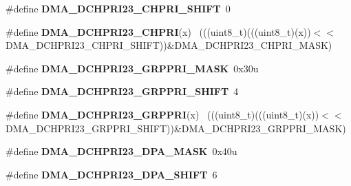 \begin{DoxyCompactItemize}
\item 
\hypertarget{group___d_m_a___register___masks_ga03381d386d0574388052124796754e0b}{}\#define {\bfseries D\+M\+A\+\_\+\+D\+C\+H\+P\+R\+I23\+\_\+\+C\+H\+P\+R\+I\+\_\+\+S\+H\+I\+F\+T}~0\label{group___d_m_a___register___masks_ga03381d386d0574388052124796754e0b}

\item 
\hypertarget{group___d_m_a___register___masks_gac7f5a2b9c90a49ef012027e61da81739}{}\#define {\bfseries D\+M\+A\+\_\+\+D\+C\+H\+P\+R\+I23\+\_\+\+C\+H\+P\+R\+I}(x)                                    ~(((uint8\+\_\+t)(((uint8\+\_\+t)(x))$<$$<$D\+M\+A\+\_\+\+D\+C\+H\+P\+R\+I23\+\_\+\+C\+H\+P\+R\+I\+\_\+\+S\+H\+I\+F\+T))\&D\+M\+A\+\_\+\+D\+C\+H\+P\+R\+I23\+\_\+\+C\+H\+P\+R\+I\+\_\+\+M\+A\+S\+K)\label{group___d_m_a___register___masks_gac7f5a2b9c90a49ef012027e61da81739}

\item 
\hypertarget{group___d_m_a___register___masks_ga105f5b5bce27499455e47dede0bd58a5}{}\#define {\bfseries D\+M\+A\+\_\+\+D\+C\+H\+P\+R\+I23\+\_\+\+G\+R\+P\+P\+R\+I\+\_\+\+M\+A\+S\+K}~0x30u\label{group___d_m_a___register___masks_ga105f5b5bce27499455e47dede0bd58a5}

\item 
\hypertarget{group___d_m_a___register___masks_gae4624de025809eb2668bbe9af6a0e1d0}{}\#define {\bfseries D\+M\+A\+\_\+\+D\+C\+H\+P\+R\+I23\+\_\+\+G\+R\+P\+P\+R\+I\+\_\+\+S\+H\+I\+F\+T}~4\label{group___d_m_a___register___masks_gae4624de025809eb2668bbe9af6a0e1d0}

\item 
\hypertarget{group___d_m_a___register___masks_ga301904dcb11ccf284f3dcf6ab1980044}{}\#define {\bfseries D\+M\+A\+\_\+\+D\+C\+H\+P\+R\+I23\+\_\+\+G\+R\+P\+P\+R\+I}(x)                                  ~(((uint8\+\_\+t)(((uint8\+\_\+t)(x))$<$$<$D\+M\+A\+\_\+\+D\+C\+H\+P\+R\+I23\+\_\+\+G\+R\+P\+P\+R\+I\+\_\+\+S\+H\+I\+F\+T))\&D\+M\+A\+\_\+\+D\+C\+H\+P\+R\+I23\+\_\+\+G\+R\+P\+P\+R\+I\+\_\+\+M\+A\+S\+K)\label{group___d_m_a___register___masks_ga301904dcb11ccf284f3dcf6ab1980044}

\item 
\hypertarget{group___d_m_a___register___masks_gaee8d0b6a13a4d1d9da98d642ab2274ef}{}\#define {\bfseries D\+M\+A\+\_\+\+D\+C\+H\+P\+R\+I23\+\_\+\+D\+P\+A\+\_\+\+M\+A\+S\+K}~0x40u\label{group___d_m_a___register___masks_gaee8d0b6a13a4d1d9da98d642ab2274ef}

\item 
\hypertarget{group___d_m_a___register___masks_ga154fc7e26867b766a88cb7c035a60ee9}{}\#define {\bfseries D\+M\+A\+\_\+\+D\+C\+H\+P\+R\+I23\+\_\+\+D\+P\+A\+\_\+\+S\+H\+I\+F\+T}~6\label{group___d_m_a___register___masks_ga154fc7e26867b766a88cb7c035a60ee9}


\end{DoxyCompactItemize}
